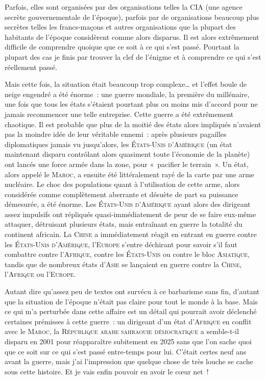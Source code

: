 {	Parfois, elles sont organisées par des organisations telles la \textsc{CIA} (une agence secrète gouvernementale de l’époque), parfois par de organisations beaucoup plus secrètes telles les francs-maçons et autres organisations que la plupart des habitants de l’époque considèrent comme alors disparus.
	Il est alors extrêmement difficile de comprendre quoique que ce soit à ce qui s’est passé.
	Pourtant la plupart des cas je finis par trouver la clef de l’énigme et à comprendre ce qui s’est réellement passé.

	Mais cette fois, la situation était beaucoup trop complexe… et l’effet boule de neige engendré a été énorme~:  une guerre mondiale, la première du millénaire, une fois que tous les états s’étaient pourtant plus ou moins mis d’accord pour ne jamais recommencer une telle entreprise.
	Cette guerre a été extrêmement chaotique.
	Il est probable que plus de la moitié des états alors impliqués n’avaient pas la moindre idée de leur véritable ennemi~:  après plusieurs pagailles diplomatiques jamais vu jusqu’alors, les \textsc{États-Unis d’Amérique} (un état maintenant disparu contrôlant alors quasiment toute l’économie de la planète) ont lancés une force armée dans la zone, pour «~pacifier le terrain~».
	Un état, alors appelé le \textsc{Maroc}, a ensuite été littéralement rayé de la carte par une arme nucléaire.
	Le choc des populations quant à l’utilisation de cette arme, alors considérée comme complètement aberrante et désuète de part sa puissance démesurée, a été énorme.
	Les \textsc{États-Unis d’Amérique} ayant alors des dirigeant assez impulsifs ont répliqués quasi-immédiatement de peur de se faire eux-même attaquer, détruisant plusieurs états, mais entraînant en guerre la totalité du continent africain.
	La \textsc{Chine} a immédiatement réagit en entrant en guerre contre les \textsc{États-Unis d’Amérique}, l’\textsc{Europe} s’entre déchirant pour savoir s’il faut combattre contre l’\textsc{Afrique}, contre les \textsc{États-Unis} ou contre le bloc \textsc{Asiatique}, tandis que de nombreux états d’\textsc{Asie} se lançaient en guerre contre la \textsc{Chine}, l’\textsc{Afrique} ou l’\textsc{Europe}.

	Autant dire qu’assez peu de textes ont survécu à ce barbarisme sans fin, d’autant que la situation de l’époque n’était pas claire pour tout le monde à la base.
	Mais ce qui m’a perturbée dans cette affaire est un détail qui pourrait avoir déclenché certaines prémisses à cette guerre~:  un dirigeant d’un état d’\textsc{Afrique} en conflit avec le \textsc{Maroc}, la \textsc{République arabe sahraouie démocratique} a semble-t-il disparu en 2001 pour réapparaître subitement en 2025 sans que l’on sache quoi que ce soit sur ce qui s’est passé entre-temps pour lui.
	C’était certes neuf ans avant la guerre, mais j’ai l’impression que quelque chose de très louche se cache sous cette histoire.
	Et je vais enfin pouvoir en avoir le cœur net~!

}
